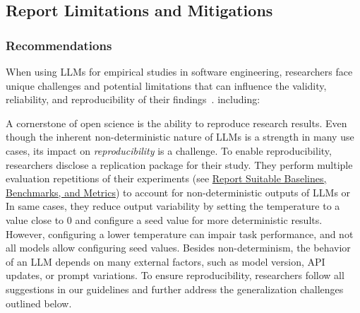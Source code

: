 



\subsection{Report Limitations and Mitigations}

\subsubsection{Recommendations}

When using LLMs for empirical studies in software engineering, researchers face unique challenges and potential limitations that can influence the validity, reliability, and reproducibility of their findings~\cite{sallou2024breaking}.
 including:

A cornerstone of open science is the ability to reproduce research results.
Even though the inherent non-deterministic nature of LLMs is a strength in many use cases, its impact on \emph{reproducibility} is a challenge. To enable reproducibility, researchers \should disclose a replication package for their study.
They \should perform multiple evaluation repetitions of their experiments (see \href{/guidelines/report-baselines-benchmarks-and-metrics}{Report Suitable Baselines, Benchmarks, and Metrics}) to account for non-deterministic outputs of LLMs or
In same cases, they \may reduce output variability by setting the temperature to a value close to 0 and configure a seed value for more deterministic results.
However, configuring a lower temperature can impair task performance, and not all models allow configuring seed values.
Besides non-determinism, the behavior of an LLM depends on many external factors, such as model version, API updates, or prompt variations.
To ensure reproducibility, researchers \should follow all suggestions in our guidelines and further address the generalization challenges outlined below.


